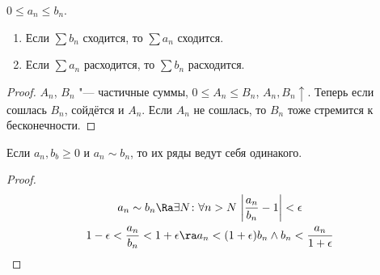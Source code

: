 \begin{theorem}
	$0 \le a_n \le b_n$.
	\begin{enumerate}
		\item Если $\sum b_n$ сходится, то $\sum a_n$ сходится.
		\item Если $\sum a_n$ расходится, то $\sum b_n$ расходится.
	\end{enumerate}
\end{theorem}
\begin{proof}
	$A_n$, $B_n$ "--- частичные суммы, $0 \le A_n \le B_n$, $A_n, B_n \uparrow$.
	Теперь если сошлась $B_n$, сойдётся и $A_n$.
	Если $A_n$ не сошлась, то $B_n$ тоже стремится к бесконечности.
\end{proof}

\begin{conseq}
	Если $a_n, b_b \ge 0$ и $a_n \sim b_n$, то их ряды ведут себя одинакого.
\end{conseq}
\begin{proof}
	\begin{gather*}
		a_n \sim b_n \Ra \exists N\colon \forall n > N\, \left|\frac{a_n}{b_n} - 1\right| < \epsilon \\
		1 - \epsilon < \frac{a_n}{b_n} < 1 + \epsilon \ra a_n < (1+\epsilon) b_n \land b_n < \frac{a_n}{1+\epsilon}
	\end{gather*}
\end{proof}

